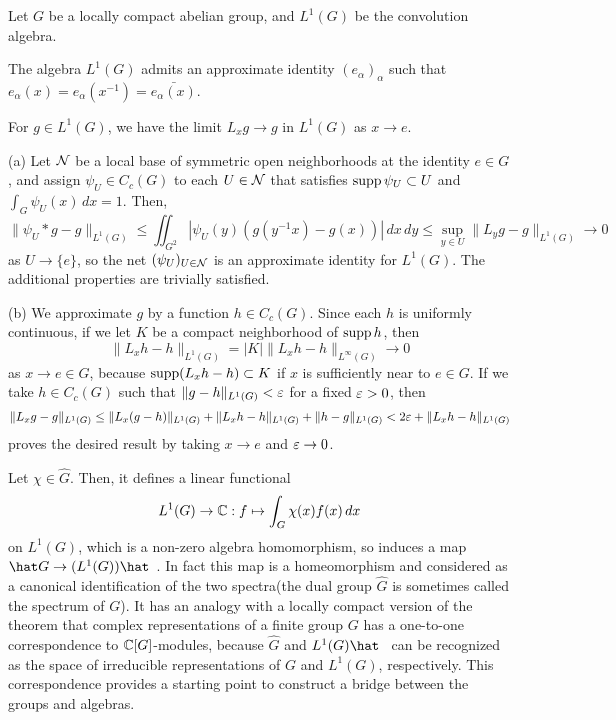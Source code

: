 \documentclass[a4paper]{article}
\begin{document}
\begin{lem}
Let $G$ be a locally compact abelian group, and $L^1(G)$ be the convolution algebra.
\begin{parts}
\item The algebra $L^1(G)$ admits an approximate identity $(e_\alpha)_\alpha$ such that $e_\alpha(x)=e_\alpha(x^{-1})=\bar{e_\alpha(x)}$.
\item For $g\in L^1(G)$, we have the limit $L_xg\to g$ in $L^1(G)$ as $x\to e$.
\end{parts}
\end{lem}
\begin{pf}
(a)
Let $\mathcal{N}$ be a local base of symmetric open neighborhoods at the identity $e\in G$, and assign $\psi_U\in C_c(G)$ to each $U\in\mathcal{N}$ that satisfies $\operatorname{supp}\psi_U\subset U$ and $\int_G\psi_U(x)\,dx=1$.
Then,
\[\|\psi_U*g-g\|_{L^1(G)}\le\iint_{G^2}|\psi_U(y)(g(y^{-1}x)-g(x))|\,dx\,dy\le\sup_{y\in U}\|L_yg-g\|_{L^1(G)}\to0\]
as $U\to\{e\}$, so the net $(\psi_U)_{U\in\mathcal{N}}$ is an approximate identity for $L^1(G)$.
The additional properties are trivially satisfied.

(b)
We approximate $g$ by a function $h\in C_c(G)$.
Since each $h$ is uniformly continuous, if we let $K$ be a compact neighborhood of $\operatorname{supp} h$, then
\[\|L_xh-h\|_{L^1(G)}=|K|\|L_xh-h\|_{L^\infty(G)}\to0\]
as $x\to e\in G$, because $\operatorname{supp}(L_xh-h)\subset K$ if $x$ is sufficiently near to $e\in G$.
If we take $h\in C_c(G)$ such that $\|g-h\|_{L^1(G)}<\varepsilon$ for a fixed $\varepsilon>0$, then
\[\|L_xg-g\|_{L^1(G)}\le\|L_x(g-h)\|_{L^1(G)}+\|L_xh-h\|_{L^1(G)}+\|h-g\|_{L^1(G)}<2\varepsilon+\|L_xh-h\|_{L^1(G)}\]
proves the desired result by taking $x\to e$ and $\varepsilon\to0$.
\end{pf}


Let $\chi\in\hat G$.
Then, it defines a linear functional
\[L^1(G)\to\mathbb{C}:f\mapsto\int_G\chi(x)f(x)\,dx\]
on $L^1(G)$, which is a non-zero algebra homomorphism, so induces a map $\hat G\to(L^1(G))\hat\enspace$.
In fact this map is a homeomorphism and considered as a canonical identification of the two spectra(the dual group $\hat G$ is sometimes called the spectrum of $G$).
It has an analogy with a locally compact version of the theorem that complex representations of a finite group $G$ has a one-to-one correspondence to $\mathbb{C}[G]$-modules, because $\hat G$ and $L^1(G)\hat\enspace$ can be recognized as the space of irreducible representations of $G$ and $L^1(G)$, respectively.
This correspondence provides a starting point to construct a bridge between the groups and algebras.
\end{document}
